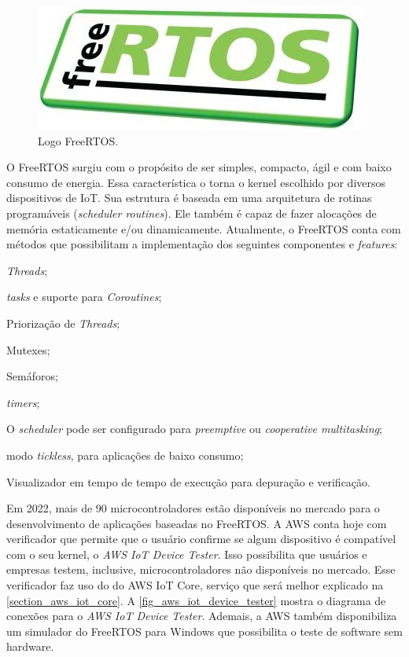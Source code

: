 \begin{figure}[htb]
	\caption{Logo FreeRTOS.}
	\begin{center}
		\includegraphics[scale=1.5]{Imagens/Logo_freeRTOS.png}
	\end{center}
	\label{fig_logo_free_rtos}
\end{figure}

O FreeRTOS surgiu com o propósito de ser simples, compacto, ágil e com baixo consumo de energia. Essa característica o torna o kernel escolhido por diversos dispositivos de IoT. Sua estrutura é baseada em uma arquitetura de rotinas programáveis (\textit{scheduler routines}). Ele também é capaz de fazer alocações de memória estaticamente e/ou dinamicamente. Atualmente, o FreeRTOS conta com métodos que possibilitam a implementação dos seguintes componentes e \textit{features}:
\begin{alineas}
	\item \textit{Threads};
	\item \textit{tasks} e suporte para \textit{Coroutines};
	\item Priorização de \textit{Threads};
	\item Mutexes;
	\item Semáforos;
	\item \textit{timers};
	\item O \textit{scheduler} pode ser configurado para \textit{preemptive} ou \textit{cooperative multitasking};
	\item modo \textit{tickless}, para aplicações de baixo consumo;
	\item Visualizador em tempo de tempo de execução para depuração e verificação.
\end{alineas}

Em 2022, mais de 90 microcontroladores estão disponíveis no mercado para o desenvolvimento de aplicações baseadas no FreeRTOS. A AWS conta hoje com verificador que permite que o usuário confirme se algum dispositivo é compatível com o seu kernel, o \textit{AWS IoT Device Tester}. Isso possibilita que usuários e empresas testem, inclusive, microcontroladores não disponíveis no mercado. Esse verificador faz uso do do AWS IoT Core, serviço que será melhor explicado na \autoref{section_aws_iot_core}. A \autoref{fig_aws_iot_device_tester} mostra o diagrama de conexões para o \textit{AWS IoT Device Tester}. Ademais, a AWS também disponibiliza um simulador do FreeRTOS para Windows que possibilita o teste de software sem hardware.

